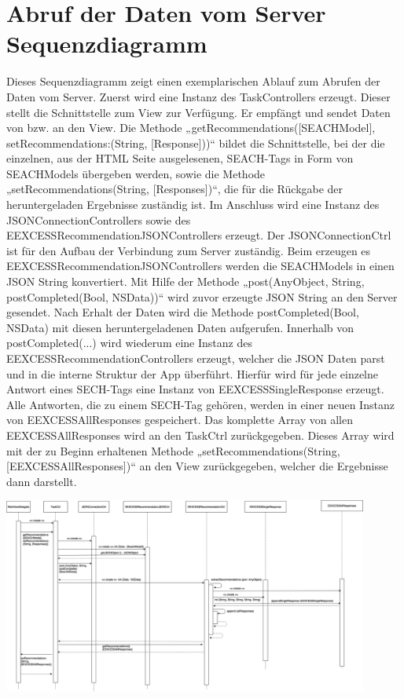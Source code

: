 \documentclass[a4paper,10pt]{article}
\begin{document}
\section{Abruf der Daten vom Server Sequenzdiagramm}

Dieses Sequenzdiagramm zeigt einen exemplarischen Ablauf zum Abrufen der Daten vom Server. Zuerst wird eine Instanz des TaskControllers erzeugt. Dieser stellt die Schnittstelle zum View zur Verfügung. Er empfängt und sendet Daten von bzw. an den View. Die Methode „getRecommendations([SEACHModel], setRecommendations:(String, [Response]))“ bildet die Schnittstelle, bei der die einzelnen, aus der HTML Seite ausgelesenen, SEACH-Tags in Form von SEACHModels übergeben werden, sowie die Methode „setRecommendations(String, [Responses])“, die für die Rückgabe der heruntergeladen Ergebnisse zuständig ist. Im Anschluss wird eine Instanz des JSONConnectionControllers sowie des EEXCESSRecommendationJSONControllers erzeugt. Der JSONConnectionCtrl ist für den Aufbau der Verbindung zum Server zuständig. Beim erzeugen es EEXCESSRecommendationJSONControllers werden die SEACHModels in einen JSON String konvertiert. Mit Hilfe der Methode „post(AnyObject, String, postCompleted(Bool, NSData))“ wird zuvor erzeugte JSON String an den Server gesendet. Nach Erhalt der Daten wird die Methode postCompleted(Bool, NSData) mit diesen heruntergeladenen Daten aufgerufen. Innerhalb von 
postCompleted(...) wird wiederum eine Instanz des EEXCESSRecommendationControllers erzeugt, welcher die JSON Daten parst und in die interne Struktur der App überführt. Hierfür wird für jede einzelne Antwort eines SECH-Tags eine Instanz von EEXCESSSingleResponse erzeugt. Alle Antworten, die zu einem SECH-Tag gehören, werden in einer neuen Instanz von EEXCESSAllResponses gespeichert.  Das komplette Array von allen EEXCESSAllResponses wird an den TaskCtrl zurückgegeben. Dieses Array wird mit der zu Beginn erhaltenen Methode „setRecommendations(String, [EEXCESSAllResponses])“ an den View zurückgegeben, welcher die Ergebnisse dann darstellt. 

\includegraphics[width=12cm]{Pics/Sequenzdiagramm_Anfragen}
\end{document}
